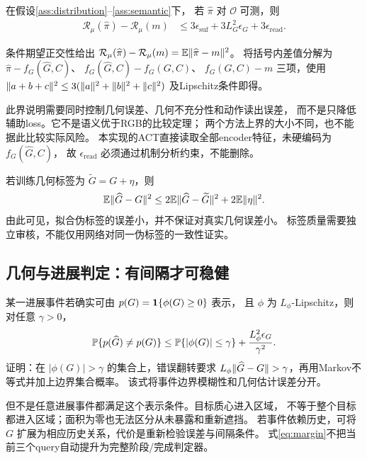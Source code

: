 \begin{proposition}[几何表示的风险上界]
\label{prop:geometry}
在假设\ref{ass:distribution}--\ref{ass:semantic}下，
若 $\widehat\pi$ 对 $\mathcal O$ 可测，则
\begin{align}
 \mathcal R_\mu(\widehat\pi)-\mathcal R_\mu(m)
 &\leq 3\epsilon_{\mathrm{suf}}+3L_G^2\epsilon_G
       +3\epsilon_{\mathrm{read}}.
 \label{eq:geometry_bound}
\end{align}
\end{proposition}
\begin{IEEEproof}
条件期望正交性给出
$\mathcal R_\mu(\widehat\pi)-\mathcal R_\mu(m)
=\mathbb{E}\lVert\widehat\pi-m\rVert^2$。
将括号内差值分解为
$\widehat\pi-f_G(\widehat G,C)$、
$f_G(\widehat G,C)-f_G(G,C)$、
$f_G(G,C)-m$ 三项，使用
$\lVert a+b+c\rVert^2\leq3(\lVert a\rVert^2+\lVert b\rVert^2+\lVert c\rVert^2)$
及Lipschitz条件即得。
\end{IEEEproof}

此界说明需要同时控制几何误差、几何不充分性和动作读出误差，
而不是只降低辅助loss。它不是语义优于RGB的比较定理；
两个方法上界的大小不同，也不能据此比较实际风险。
本实现的ACT直接读取全部encoder特征，未硬编码为 $f_G(\widehat G,C)$，
故 $\epsilon_{\mathrm{read}}$ 必须通过机制分析约束，不能删除。

若训练几何标签为 $\widetilde G=G+\eta$，则
\begin{equation}
 \mathbb{E}\lVert\widehat G-G\rVert^2
 \leq 2\mathbb{E}\lVert\widehat G-\widetilde G\rVert^2+2\mathbb{E}\lVert\eta\rVert^2.
 \label{eq:label_noise}
\end{equation}
由此可见，拟合伪标签的误差小，并不保证对真实几何误差小。
标签质量需要独立审核，不能仅用网络对同一伪标签的一致性证实。

\subsection{几何与进展判定：有间隔才可稳健}

某一进展事件若确实可由 $p(G)=\mathbf{1}\{\phi(G)\geq0\}$ 表示，
且 $\phi$ 为 $L_\phi$-Lipschitz，则对任意 $\gamma>0$，
\begin{equation}
 \mathbb{P}\{p(\widehat G)\ne p(G)\}
 \leq\mathbb{P}\{|\phi(G)|\leq\gamma\}
      +\frac{L_\phi^2\epsilon_G}{\gamma^2}.
 \label{eq:margin}
\end{equation}
证明：在 $|\phi(G)|>\gamma$ 的集合上，错误翻转要求
$L_\phi\lVert\widehat G-G\rVert>\gamma$，再用Markov不等式并加上边界集合概率。
该式将事件边界模糊性和几何估计误差分开。

但不是任意进展事件都满足这个表示条件。目标质心进入区域，
不等于整个目标都进入区域；面积为零也无法区分从未暴露和重新遮挡。
若事件依赖历史，可将 $G$ 扩展为相应历史关系，代价是重新检验误差与间隔条件。
式\eqref{eq:margin}不把当前三个query自动提升为完整阶段/完成判定器。

